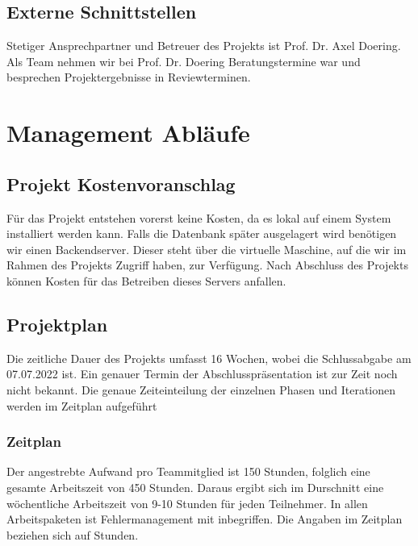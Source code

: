 \documentclass[12pt,a4paper,onecolumn]{article}
\begin{document}
\subsection{Externe Schnittstellen}
Stetiger Ansprechpartner und Betreuer des Projekts ist Prof. Dr. Axel Doering. Als Team nehmen wir bei Prof. Dr. Doering Beratungstermine war und besprechen Projektergebnisse in Reviewterminen. 

\section{Management Abläufe}
\subsection{Projekt Kostenvoranschlag}
Für das Projekt entstehen vorerst keine Kosten, da es lokal auf einem System installiert werden kann. Falls die Datenbank später ausgelagert wird benötigen wir
einen Backendserver. Dieser steht über die virtuelle Maschine, auf die wir im Rahmen des Projekts Zugriff haben, zur Verfügung. Nach Abschluss des Projekts können Kosten für das Betreiben dieses Servers anfallen.
\subsection{Projektplan}
Die zeitliche Dauer des Projekts umfasst 16 Wochen, wobei die Schlussabgabe am 07.07.2022 ist. Ein genauer Termin der Abschlusspräsentation ist zur Zeit noch nicht bekannt. Die genaue Zeiteinteilung der einzelnen Phasen und Iterationen werden im Zeitplan aufgeführt
\subsubsection{Zeitplan}
Der angestrebte Aufwand pro Teammitglied ist 150 Stunden, folglich eine gesamte Arbeitszeit von 450 Stunden. Daraus ergibt sich im Durschnitt eine wöchentliche Arbeitszeit von 9-10 Stunden für jeden Teilnehmer. In allen Arbeitspaketen ist Fehlermanagement mit inbegriffen. Die Angaben im Zeitplan beziehen sich auf Stunden.\\
\end{document}
